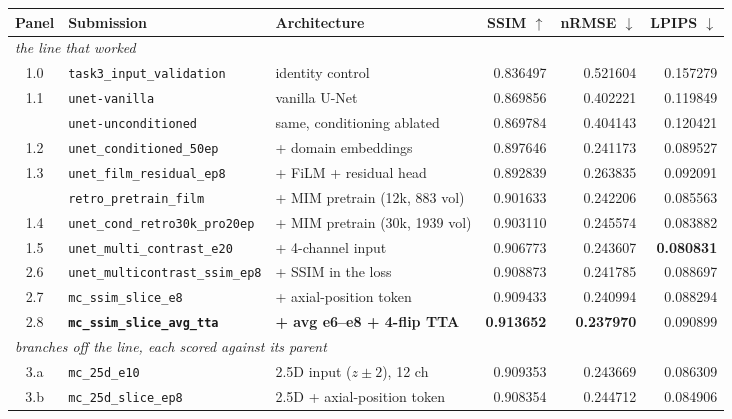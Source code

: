 \documentclass[10pt,a4paper]{article}
\begin{document}
\begin{table}[H]
\centering
\small\setlength{\tabcolsep}{4pt}
\begin{tabular}{cllrrr}
\toprule
Panel & Submission & Architecture & SSIM $\uparrow$ & nRMSE $\downarrow$ & LPIPS $\downarrow$ \\
\midrule
\multicolumn{6}{l}{\itshape the line that worked} \\
1.0 & \texttt{task3\_input\_validation}      & identity control                & 0.836497 & 0.521604 & 0.157279 \\
1.1 & \texttt{unet-vanilla}                  & vanilla U-Net                   & 0.869856 & 0.402221 & 0.119849 \\
    & \texttt{unet-unconditioned}            & same, conditioning ablated      & 0.869784 & 0.404143 & 0.120421 \\
1.2 & \texttt{unet\_conditioned\_50ep}       & + domain embeddings             & 0.897646 & 0.241173 & 0.089527 \\
1.3 & \texttt{unet\_film\_residual\_ep8}     & + FiLM + residual head          & 0.892839 & 0.263835 & 0.092091 \\
    & \texttt{retro\_pretrain\_film}         & + MIM pretrain (12k, 883 vol)   & 0.901633 & 0.242206 & 0.085563 \\
1.4 & \texttt{unet\_cond\_retro30k\_pro20ep} & + MIM pretrain (30k, 1939 vol)  & 0.903110 & 0.245574 & 0.083882 \\
1.5 & \texttt{unet\_multi\_contrast\_e20}    & + 4-channel input               & 0.906773 & 0.243607 & \textbf{0.080831} \\
2.6 & \texttt{unet\_multicontrast\_ssim\_ep8}& + SSIM in the loss              & 0.908873 & 0.241785 & 0.088697 \\
2.7 & \texttt{mc\_ssim\_slice\_e8}           & + axial-position token          & 0.909433 & 0.240994 & 0.088294 \\
2.8 & \textbf{\texttt{mc\_ssim\_slice\_avg\_tta}} & \textbf{+ avg e6--e8 + 4-flip TTA} & \textbf{0.913652} & \textbf{0.237970} & 0.090899 \\
\midrule
\multicolumn{6}{l}{\itshape branches off the line, each scored against its parent} \\
3.a & \texttt{mc\_25d\_e10}                  & 2.5D input ($z\pm2$), 12 ch     & 0.909353 & 0.243669 & 0.086309 \\
3.b & \texttt{mc\_25d\_slice\_ep8}           & 2.5D + axial-position token     & 0.908354 & 0.244712 & 0.084906 \\

\end{tabular}
\end{table}
\end{document}
